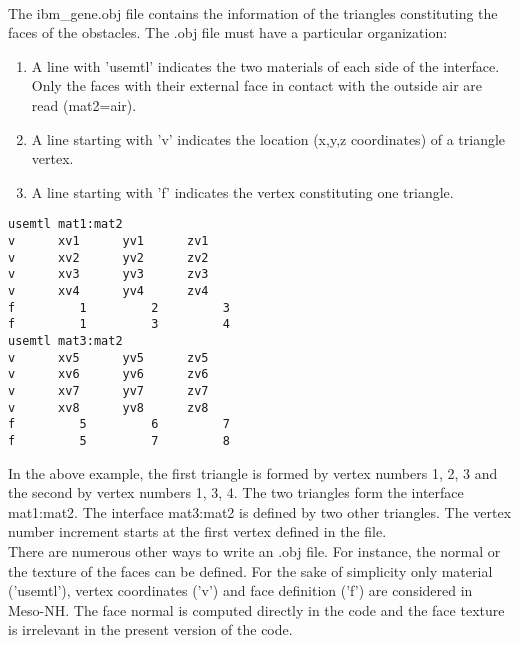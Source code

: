 \\
The ibm\_gene.obj file contains the information of the triangles constituting the faces of the obstacles. 
The .obj file must have a particular organization:
\begin{enumerate}
 \item A line with 'usemtl' indicates the two materials of each side of the interface. Only the faces with  their external face in contact with the outside air are read (mat2=air).
 \item A line starting with 'v' indicates the location (x,y,z coordinates) of a triangle vertex.
 \item A line starting with 'f' indicates the vertex constituting one triangle.
\end{enumerate}
\begin{verbatim}
usemtl mat1:mat2
v      xv1      yv1      zv1
v      xv2      yv2      zv2
v      xv3      yv3      zv3
v      xv4      yv4      zv4
f         1         2         3
f         1         3         4
usemtl mat3:mat2
v      xv5      yv5      zv5
v      xv6      yv6      zv6
v      xv7      yv7      zv7
v      xv8      yv8      zv8
f         5         6         7
f         5         7         8
\end{verbatim}
In the above example, the first triangle is formed by vertex numbers
1, 2, 3 and the second by vertex numbers 1, 3, 4. The two triangles form the interface mat1:mat2.
The interface mat3:mat2 is defined by two other triangles. The vertex number increment starts at the first vertex defined in the file.
\\There are numerous other ways to write an .obj file. For instance,
the normal or the texture of the faces can be defined. For the sake of
simplicity only material ('usemtl'), vertex coordinates ('v') and face
definition ('f') are considered in Meso-NH. The face normal is
computed directly in the code and the face texture is irrelevant
in the present version of the code.

